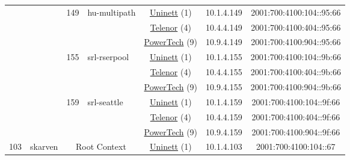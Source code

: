 \begin{small}
\begin{center}
\begin{longtable}{|c|c|c|c|c|c|c|c|}
  &  & \multirow{3}{*}{\tiny{149}} & \multicolumn{1}{|l|}{\multirow{3}{*}{\tiny{hu-multipath}}} & \multicolumn{2}{|c|}{\tiny{\href{https://www.uninett.no}{Uninett} (1)}} & \tiny{10.1.4.149} & \tiny{2001:700:4100:104::95:66} \\* \cline{5-5}\cline{6-6}\cline{7-7}\cline{8-8}
  &  &  &  & \multicolumn{2}{|c|}{\tiny{\href{https://www.telenor.no}{Telenor} (4)}} & \tiny{10.4.4.149} & \tiny{2001:700:4100:404::95:66} \\* \cline{5-5}\cline{6-6}\cline{7-7}\cline{8-8}
  &  &  &  & \multicolumn{2}{|c|}{\tiny{\href{http://www.powertech.no}{PowerTech} (9)}} & \tiny{10.9.4.149} & \tiny{2001:700:4100:904::95:66} \\* \cline{3-3}\cline{4-4}\cline{5-5}\cline{6-6}\cline{7-7}\cline{8-8}
  &  & \multirow{3}{*}{\tiny{155}} & \multicolumn{1}{|l|}{\multirow{3}{*}{\tiny{srl-rserpool}}} & \multicolumn{2}{|c|}{\tiny{\href{https://www.uninett.no}{Uninett} (1)}} & \tiny{10.1.4.155} & \tiny{2001:700:4100:104::9b:66} \\* \cline{5-5}\cline{6-6}\cline{7-7}\cline{8-8}
  &  &  &  & \multicolumn{2}{|c|}{\tiny{\href{https://www.telenor.no}{Telenor} (4)}} & \tiny{10.4.4.155} & \tiny{2001:700:4100:404::9b:66} \\* \cline{5-5}\cline{6-6}\cline{7-7}\cline{8-8}
  &  &  &  & \multicolumn{2}{|c|}{\tiny{\href{http://www.powertech.no}{PowerTech} (9)}} & \tiny{10.9.4.155} & \tiny{2001:700:4100:904::9b:66} \\* \cline{3-3}\cline{4-4}\cline{5-5}\cline{6-6}\cline{7-7}\cline{8-8}
  &  & \multirow{3}{*}{\tiny{159}} & \multicolumn{1}{|l|}{\multirow{3}{*}{\tiny{srl-seattle}}} & \multicolumn{2}{|c|}{\tiny{\href{https://www.uninett.no}{Uninett} (1)}} & \tiny{10.1.4.159} & \tiny{2001:700:4100:104::9f:66} \\* \cline{5-5}\cline{6-6}\cline{7-7}\cline{8-8}
  &  &  &  & \multicolumn{2}{|c|}{\tiny{\href{https://www.telenor.no}{Telenor} (4)}} & \tiny{10.4.4.159} & \tiny{2001:700:4100:404::9f:66} \\* \cline{5-5}\cline{6-6}\cline{7-7}\cline{8-8}
  &  &  &  & \multicolumn{2}{|c|}{\tiny{\href{http://www.powertech.no}{PowerTech} (9)}} & \tiny{10.9.4.159} & \tiny{2001:700:4100:904::9f:66} \\ \hline
 \multirow{30}{*}{\tiny{103}} & \multicolumn{1}{|l|}{\multirow{30}{*}{\tiny{skarven}}} & \multicolumn{2}{|c|}{\multirow{3}{*}{\tiny{Root Context}}} & \multicolumn{2}{|c|}{\tiny{\href{https://www.uninett.no}{Uninett} (1)}} & \tiny{10.1.4.103} & \tiny{2001:700:4100:104::67} \\* \cline{5-5}\cline{6-6}\cline{7-7}\cline{8-8}

\end{longtable}
\end{center}
\end{small}
